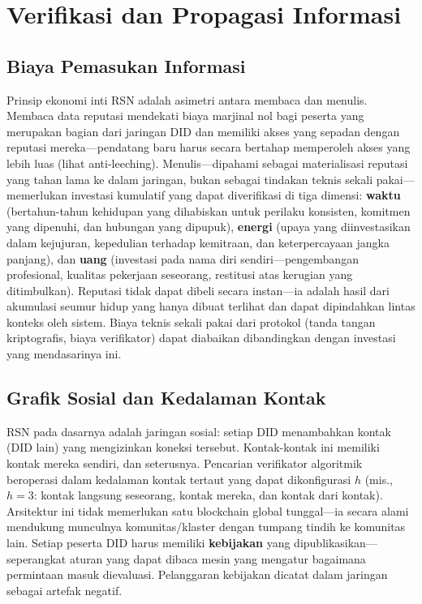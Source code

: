 \documentclass[11pt,a4paper,twocolumn]{article}
\begin{document}
\section{Verifikasi dan Propagasi Informasi}

\subsection{Biaya Pemasukan Informasi}

Prinsip ekonomi inti RSN adalah asimetri antara membaca dan menulis. Membaca data reputasi mendekati biaya marjinal nol bagi peserta yang merupakan bagian dari jaringan DID dan memiliki akses yang sepadan dengan reputasi mereka---pendatang baru harus secara bertahap memperoleh akses yang lebih luas (lihat anti-leeching). Menulis---dipahami sebagai materialisasi reputasi yang tahan lama ke dalam jaringan, bukan sebagai tindakan teknis sekali pakai---memerlukan investasi kumulatif yang dapat diverifikasi di tiga dimensi: \textbf{waktu} (bertahun-tahun kehidupan yang dihabiskan untuk perilaku konsisten, komitmen yang dipenuhi, dan hubungan yang dipupuk), \textbf{energi} (upaya yang diinvestasikan dalam kejujuran, kepedulian terhadap kemitraan, dan keterpercayaan jangka panjang), dan \textbf{uang} (investasi pada nama diri sendiri---pengembangan profesional, kualitas pekerjaan seseorang, restitusi atas kerugian yang ditimbulkan). Reputasi tidak dapat dibeli secara instan---ia adalah hasil dari akumulasi seumur hidup yang hanya dibuat terlihat dan dapat dipindahkan lintas konteks oleh sistem. Biaya teknis sekali pakai dari protokol (tanda tangan kriptografis, biaya verifikator) dapat diabaikan dibandingkan dengan investasi yang mendasarinya ini.

\subsection{Grafik Sosial dan Kedalaman Kontak}

RSN pada dasarnya adalah jaringan sosial: setiap DID menambahkan kontak (DID lain) yang mengizinkan koneksi tersebut. Kontak-kontak ini memiliki kontak mereka sendiri, dan seterusnya. Pencarian verifikator algoritmik beroperasi dalam kedalaman kontak tertaut yang dapat dikonfigurasi $h$ (mis., $h=3$: kontak langsung seseorang, kontak mereka, dan kontak dari kontak). Arsitektur ini tidak memerlukan satu blockchain global tunggal---ia secara alami mendukung munculnya komunitas/klaster dengan tumpang tindih ke komunitas lain. Setiap peserta DID harus memiliki \textbf{kebijakan} yang dipublikasikan---seperangkat aturan yang dapat dibaca mesin yang mengatur bagaimana permintaan masuk dievaluasi. Pelanggaran kebijakan dicatat dalam jaringan sebagai artefak negatif.
\end{document}
